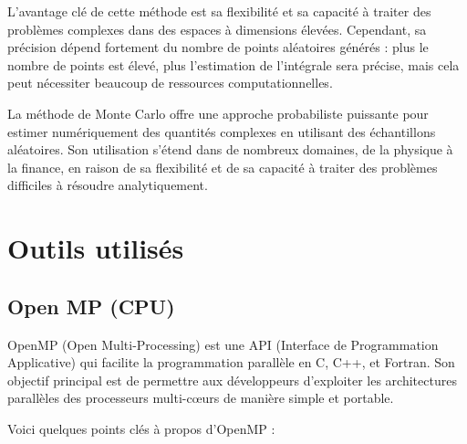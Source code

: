 \documentclass[10pt,a4paper]{article}
\begin{document}
L'avantage clé de cette méthode est sa flexibilité et sa capacité à traiter des problèmes complexes dans des espaces à dimensions élevées. Cependant, sa précision dépend fortement du nombre de points aléatoires générés : plus le nombre de points est élevé, plus l'estimation de l'intégrale sera précise, mais cela peut nécessiter beaucoup de ressources computationnelles.

La méthode de Monte Carlo offre une approche probabiliste puissante pour estimer numériquement des quantités complexes en utilisant des échantillons aléatoires. Son utilisation s'étend dans de nombreux domaines, de la physique à la finance, en raison de sa flexibilité et de sa capacité à traiter des problèmes difficiles à résoudre analytiquement.


\section{Outils utilisés}

\subsection{Open MP (CPU)}

OpenMP (Open Multi-Processing) est une API (Interface de Programmation Applicative) qui facilite la programmation parallèle en C, C++, et Fortran. Son objectif principal est de permettre aux développeurs d'exploiter les architectures parallèles des processeurs multi-cœurs de manière simple et portable.

Voici quelques points clés à propos d'OpenMP :
\end{document}
